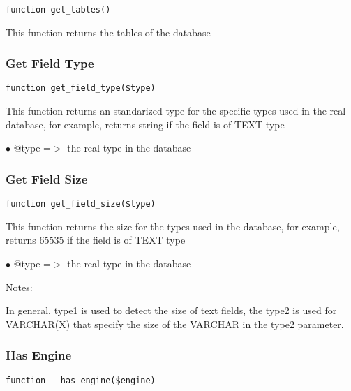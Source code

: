 \documentclass[a4paper]{article}
\begin{document}
\begin{lstlisting}
function get_tables()
\end{lstlisting}

This function returns the tables of the database

\hypertarget{toc223}{}
\subsubsection{Get Field Type}

\begin{lstlisting}
function get_field_type($type)
\end{lstlisting}

This function returns an standarized type for the specific types used in
the real database, for example, returns string if the field is of TEXT type

\begin{compactitem}
\item[\color{myblue}$\bullet$] @type =$>$ the real type in the database
\end{compactitem}

\hypertarget{toc224}{}
\subsubsection{Get Field Size}

\begin{lstlisting}
function get_field_size($type)
\end{lstlisting}

This function returns the size for the types used in the database, for
example, returns 65535 if the field is of TEXT type

\begin{compactitem}
\item[\color{myblue}$\bullet$] @type =$>$ the real type in the database
\end{compactitem}

Notes:

In general, type1 is used to detect the size of text fields, the type2
is used for VARCHAR(X) that specify the size of the VARCHAR in the type2
parameter.

\hypertarget{toc225}{}
\subsubsection{Has Engine}

\begin{lstlisting}
function __has_engine($engine)
\end{lstlisting}
\end{document}

